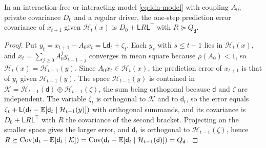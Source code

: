 \begin{lemma}\label{lem:idn-innovation}
In an interaction-free or interacting model \cref{eq:idn-model} with coupling $A_0$, private covariance $D_0$ and a regular driver, the one-step prediction error covariance of $x_{t+1}$ given $\mathcal H_t(x)$ is $D_0+\mathsf LR\mathsf L^{\top}$ with $R\succeq Q_{\mathsf d}$.
\end{lemma}

\begin{proof}
Put $y_t=x_{t+1}-A_0x_t=\mathsf L\mathsf d_t+\zeta_t$. Each $y_s$ with $s\le t-1$ lies in $\mathcal H_t(x)$, and $x_t=\sum_{j\ge0}A_0^jy_{t-1-j}$ converges in mean square because $\rho(A_0)<1$, so $\mathcal H_t(x)=\mathcal H_{t-1}(y)$. Since $A_0x_t\in\mathcal H_t(x)$, the prediction error of $x_{t+1}$ is that of $y_t$ given $\mathcal H_{t-1}(y)$. The space $\mathcal H_{t-1}(y)$ is contained in $\mathcal K=\mathcal H_{t-1}(\mathsf d)\oplus\mathcal H_{t-1}(\zeta)$, the sum being orthogonal because $\mathsf d$ and $\zeta$ are independent. The variable $\zeta_t$ is orthogonal to $\mathcal K$ and to $\mathsf d_t$, so the error equals $\zeta_t+\mathsf L(\mathsf d_t-\mathbb{E}[\mathsf d_t\mid\mathcal H_{t-1}(y)])$ with orthogonal summands, and its covariance is $D_0+\mathsf LR\mathsf L^{\top}$ with $R$ the covariance of the second bracket. Projecting on the smaller space gives the larger error, and $\mathsf d_t$ is orthogonal to $\mathcal H_{t-1}(\zeta)$, hence $R\succeq\operatorname{Cov}(\mathsf d_t-\mathbb{E}[\mathsf d_t\mid\mathcal K])=\operatorname{Cov}(\mathsf d_t-\mathbb{E}[\mathsf d_t\mid\mathcal H_{t-1}(\mathsf d)])=Q_{\mathsf d}$.
\end{proof}

